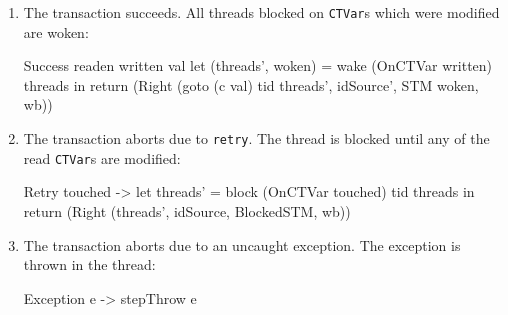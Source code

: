 \begin{enumerate}
\item The transaction succeeds. All threads blocked on \verb|CTVar|s
  which were modified are woken:

\begin{haskellcode}
    Success readen written val
      let (threads', woken) = wake (OnCTVar written) threads
      in return (Right (goto (c val) tid threads', idSource', STM woken, wb))
\end{haskellcode}

\item The transaction aborts due to \verb|retry|. The thread is
  blocked until any of the read \verb|CTVar|s are modified:

\begin{haskellcode}
    Retry touched ->
      let threads' = block (OnCTVar touched) tid threads
      in return (Right (threads', idSource, BlockedSTM, wb))
\end{haskellcode}

\item The transaction aborts due to an uncaught exception. The
  exception is thrown in the thread:

\begin{haskellcode}
    Exception e -> stepThrow e
\end{haskellcode}

\end{enumerate}
